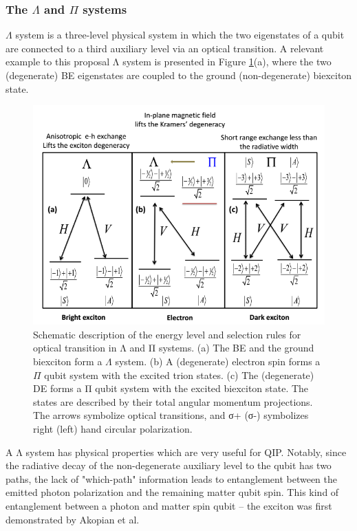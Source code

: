 \subsubsection{The $\Lambda $ and $\Pi$ systems}
$\Lambda$ system is a three-level physical system in which the two eigenstates of a qubit are connected to a third auxiliary level via an optical transition. A relevant example to this proposal Λ system is presented in Figure \ref{fig:PiSystem}(a), where the two (degenerate) BE eigenstates are coupled to the ground (non-degenerate) biexciton state.
\begin{figure}[H]
	\centering
	\includegraphics[scale=0.32]{figures/pI_System.png}
	\caption{Schematic description of the energy level and selection rules for
optical transition in Λ and Π systems. (a) The BE and the ground biexciton form a $\Lambda$ system. (b) A (degenerate) electron spin forms a $\Pi$ qubit system
with the excited trion states. (c) The (degenerate) DE forms a Π qubit system
with the excited biexciton state. The states are described by their total
angular momentum projections. The arrows symbolize optical transitions, and σ+ (σ-) symbolizes right (left) hand circular polarization.}
	\label{fig:PiSystem}
\end{figure}
A Λ system has physical properties which are very useful for QIP. Notably, since the radiative decay of the non-degenerate auxiliary level to the qubit has two paths, the lack of "which-path" information leads to entanglement
between the emitted photon polarization and the remaining matter qubit spin. This kind of entanglement between a photon and matter spin qubit – the exciton was first demonstrated by Akopian et al. \cite{Akopian2006}
